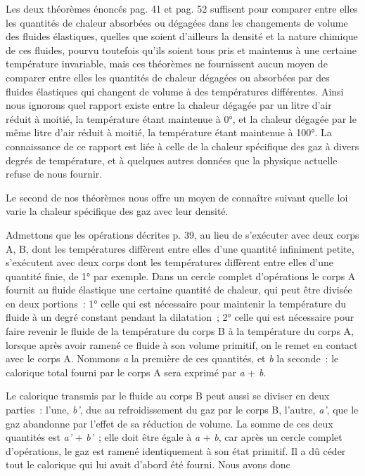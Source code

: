 \documentclass[french,twoside]{book} %
\begin{document}
Les deux théorèmes énoncés pag. 41 et pag. 52 suffisent pour comparer entre elles les quantités de chaleur absorbées ou dégagées dans les changements de volume des fluides élastiques, quelles que soient d’ailleurs la densité et la nature chimique de ces fluides, pourvu toutefois qu’ils soient tous pris et maintenus à une certaine température invariable, mais ces théorèmes ne fournissent aucun moyen de comparer entre elles les quantités de chaleur dégagées ou absorbées par des fluides élastiques qui changent de volume à des températures différentes. Ainsi nous ignorons quel rapport existe entre la chaleur dégagée par un litre d’air réduit à moitié, la température étant maintenue à 0°, et la chaleur dégagée par le même litre d’air réduit à moitié, la température étant maintenue à 100°. La connaissance de ce rapport est liée à celle de la chaleur spécifique des gaz à divers degrés de température, et à quelques autres données que la physique actuelle refuse de nous fournir.\par
Le second de nos théorèmes nous offre un moyen de connaître suivant quelle loi varie la chaleur spécifique des gaz avec leur densité.\par
Admettons que les opérations décrites p. 39, au lieu de s’exécuter avec deux corps A, B, dont les températures diffèrent entre elles d’une quantité infiniment petite, s’exécutent avec deux corps dont les températures diffèrent entre elles d’une quantité finie, de 1° par exemple. Dans un cercle complet d’opérations le corps A fournit au fluide élastique une certaine quantité de chaleur, qui peut être divisée en deux portions : 1° celle qui est nécessaire pour maintenir la température du fluide à un degré constant pendant la dilatation ; 2° celle qui est nécessaire pour faire revenir le fluide de la température du corps B à la température du corps A, lorsque après avoir ramené ce fluide à son volume primitif, on le remet en contact avec le corps A. Nommons \emph{a} la première de ces quantités, et \emph{b} la seconde : le calorique total fourni par le corps A sera exprimé par \emph{a} + \emph{b}.\par
Le calorique transmis par le fluide au corps B peut aussi se diviser en deux parties : l’une, \emph{b’}, due au refroidissement du gaz par le corps B, l’autre, \emph{a’}, que le gaz abandonne par l’effet de sa réduction de volume. La somme de ces deux quantités est \emph{a’} + \emph{b’} ; elle doit être égale à \emph{a} + \emph{b}, car après un cercle complet d’opérations, le gaz est ramené identiquement à son état primitif. Il a dû céder tout le calorique qui lui avait d’abord été fourni. Nous avons donc\par
\end{document}
